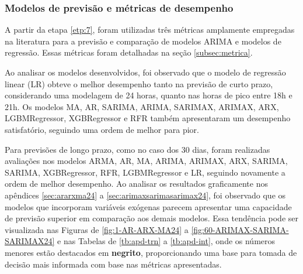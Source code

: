 \subsubsection{Modelos de previs\~ao e m\'etricas de desempenho}\label{subsubsec:modelos}

A partir da etapa \ref{etp:7}, foram utilizadas três métricas amplamente empregadas na literatura para a previsão e comparação de modelos ARIMA e modelos de regressão. Essas métricas foram detalhadas na seção \ref{subsec:metrica}.

Ao analisar os modelos desenvolvidos, foi observado que o modelo de regressão linear (LR) obteve o melhor desempenho tanto na previsão de curto prazo, considerando uma modelagem de 24 horas, quanto nas horas de pico entre 18h e 21h. Os modelos MA, AR, SARIMA, ARIMA, SARIMAX, ARIMAX, ARX, LGBMRegressor, XGBRegressor e RFR também apresentaram um desempenho satisfatório, seguindo uma ordem de melhor para pior.

Para previsões de longo prazo, como no caso dos 30 dias, foram realizadas avaliações nos modelos ARMA, AR, MA, ARIMA, ARIMAX, ARX, SARIMA, SARIMA, XGBRegressor, RFR, LGBMRegressor e LR, seguindo novamente a ordem de melhor desempenho. Ao analisar os resultados graficamente nos apêndices \ref{sec:ararxma24} a \ref{sec:arimaxsarimasarimax24}, foi observado que os modelos que incorporam variáveis exógenas parecem apresentar uma capacidade de previsão superior em comparação aos demais modelos. Essa tendência pode ser visualizada nas Figuras de \ref{fig:1-AR-ARX-MA24} a \ref{fig:60-ARIMAX-SARIMA-SARIMAX24} e nas Tabelas de \ref{tb:apd-trn} a \ref{tb:apd-int}, onde os números menores estão destacados em \textbf{negrito}, proporcionando uma base para tomada de decisão mais informada com base nas métricas apresentadas.
